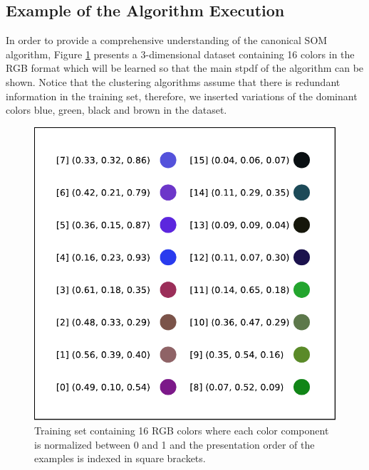 
\subsection{Example of the Algorithm Execution}
\label{sec:algorithmExecution}

In order to provide a comprehensive understanding of the canonical SOM algorithm, Figure \ref{fig:trset} presents a 3-dimensional dataset containing 16 colors in the RGB format which will be learned so that the main stpdf of the algorithm can be shown. Notice that the clustering algorithms assume that there is redundant information in the training set, therefore, we inserted variations of the dominant colors blue, green, black and brown in the dataset. 

\begin{figure}[h!]
\centering
\includegraphics[scale=0.6]{"Part 3 - Learning Systems/Unsupervised Learning/Self-Organizing Maps/figs/trainingSet.pdf"}
\caption{Training set containing 16 RGB colors where each color component is normalized between 0 and 1 and the presentation order of the examples is indexed in square brackets.}
\label{fig:trset}
\end{figure}

